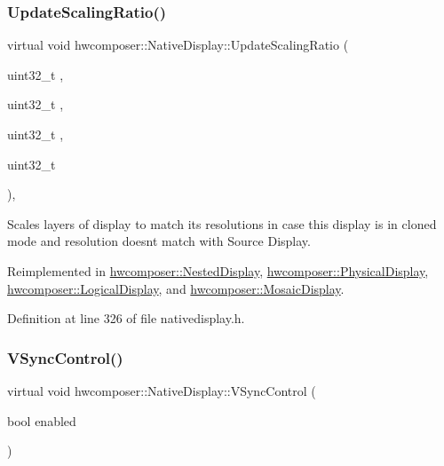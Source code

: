 \subsubsection{\texorpdfstring{Update\+Scaling\+Ratio()}{UpdateScalingRatio()}}
{\footnotesize\ttfamily virtual void hwcomposer\+::\+Native\+Display\+::\+Update\+Scaling\+Ratio (\begin{DoxyParamCaption}\item[{uint32\+\_\+t}]{,  }\item[{uint32\+\_\+t}]{,  }\item[{uint32\+\_\+t}]{,  }\item[{uint32\+\_\+t}]{ }\end{DoxyParamCaption})\hspace{0.3cm}{\ttfamily [inline]}, {\ttfamily [virtual]}}

Scales layers of display to match it\textquotesingle{}s resolutions in case this display is in cloned mode and resolution doesn\textquotesingle{}t match with Source Display. 

Reimplemented in \mbox{\hyperlink{classhwcomposer_1_1NestedDisplay_a0eb08cdb0c39587a72021ff945d33b72}{hwcomposer\+::\+Nested\+Display}}, \mbox{\hyperlink{classhwcomposer_1_1PhysicalDisplay_a58541ff74976131b84a4dac060a48c45}{hwcomposer\+::\+Physical\+Display}}, \mbox{\hyperlink{classhwcomposer_1_1LogicalDisplay_ad4813941543f9765790888d7e7c6865f}{hwcomposer\+::\+Logical\+Display}}, and \mbox{\hyperlink{classhwcomposer_1_1MosaicDisplay_aa0d5befb882537555f4476130863c27c}{hwcomposer\+::\+Mosaic\+Display}}.



Definition at line 326 of file nativedisplay.\+h.


\begin{DoxyCode}{0}
\end{DoxyCode}
\mbox{\label{classhwcomposer_1_1NativeDisplay_a6817e88bc9def8ae1ae8088922803dc1}} 
\subsubsection{\texorpdfstring{V\+Sync\+Control()}{VSyncControl()}}
{\footnotesize\ttfamily virtual void hwcomposer\+::\+Native\+Display\+::\+V\+Sync\+Control (\begin{DoxyParamCaption}\item[{bool}]{enabled }\end{DoxyParamCaption})\hspace{0.3cm}{\ttfamily [pure virtual]}}



